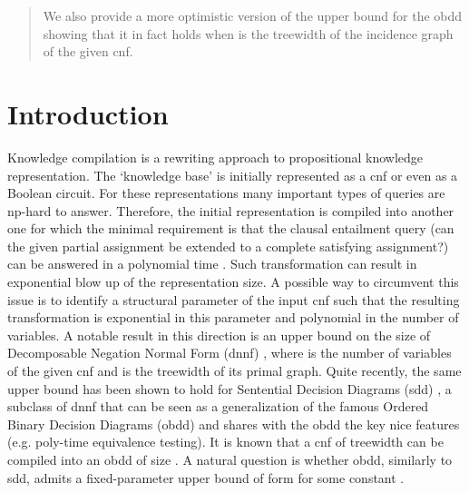 \documentclass{article}
\begin{document}
\begin{abstract}
We also provide a more optimistic version of the  upper bound for the {\sc obdd} showing
that it in fact holds when  is the treewidth of the incidence graph of the given {\sc cnf}.
\begin{comment}
Thus together with the upper bound of \cite{VardiTWD},
the results of this paper provide a complete classification of the expressive power of {\sc obdd} for
{\sc cnf}s parameterized by the treewidth of their primal and incidence graphs.
\end{comment} 
\begin{comment}
In \cite{VardiTWD}, it is shown that a CNF of  variables and the treewidth
 of its primal graph can be compiled into an Ordered Binary Decision Diagram (OBDD)
of size . In this paper we show that there is an infinite class of CNFs for 
which the OBDD size is at least  thus essentially matching the above upper bound.
To the best of our knowledge, this is the first result ruling the possibility of fixed-parameter
tractable size OBDDs for CNFs of bounded treewidth. We also show that the  upper bound
holds for the case where  is the treewidth of the incidence graph of the given {\sc cnf}.
\end{comment}
\end{abstract}

\section{Introduction}
Knowledge compilation is a rewriting approach to propositional knowledge representation.
The `knowledge base' is initially represented as a {\sc cnf} or even as a Boolean circuit. 
For these representations many important types of queries are {\sc np}-hard to answer.
Therefore, the initial representation is compiled into another one 
for which the minimal requirement is that the clausal entailment query
(can the given partial assignment be extended to a complete satisfying assignment?)
can be answered in a polynomial time \cite{DerMar}. Such transformation can result in exponential
blow up of the representation size. A possible way to circumvent this issue is to
identify a structural parameter of the input {\sc cnf} such that the resulting transformation
is exponential in this parameter and polynomial in the number of variables.
A notable result in this direction is an  upper bound on the size of
Decomposable Negation Normal Form ({\sc dnnf}) \cite{DarwicheJACM}, where  is the
number of variables of the given {\sc cnf} and  is the treewidth of its primal graph.
Quite recently, the same upper bound has been shown to hold for Sentential Decision Diagrams ({\sc sdd}) \cite{SDD},
a subclass of {\sc dnnf}  
that can be seen as a generalization
of the famous Ordered Binary Decision Diagrams ({\sc obdd}) and 
shares with the {\sc obdd} the key nice features (e.g. poly-time equivalence testing). It is known that a {\sc cnf} of treewidth
 can be compiled into an {\sc obdd} of size  \cite{VardiTWD}. A natural question is whether 
{\sc obdd}, similarly to {\sc sdd}, admits a fixed-parameter upper bound of form  for some constant . 
\end{document}
